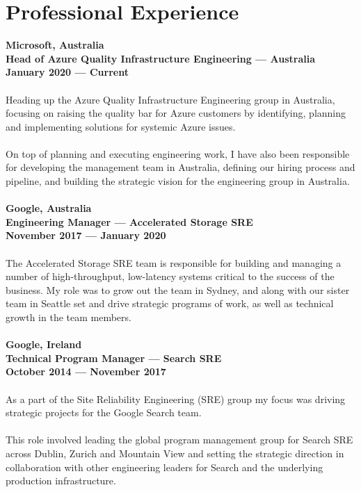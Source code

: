 \documentclass[a4paper]{article}
\begin{document}
\section*{Professional Experience}
\textbf{Microsoft, Australia\\Head of Azure Quality Infrastructure Engineering --- Australia\\January 2020 --- Current}\\\\
Heading up the Azure Quality Infrastructure Engineering group in Australia, focusing on raising the quality bar for Azure customers by identifying, planning and implementing solutions for systemic Azure issues.\\\\
On top of planning and executing engineering work, I have also been responsible for developing the management team in Australia, defining our hiring process and pipeline, and building the strategic vision for the engineering group in Australia.\\\\
\textbf{Google, Australia\\Engineering Manager --- Accelerated Storage SRE\\November 2017 --- January 2020}\\\\
The Accelerated Storage SRE team is responsible for building and managing a number of high-throughput, low-latency systems critical to the success of the business. My role was to grow out the team in Sydney, and along with our sister team in Seattle set and drive strategic programs of work, as well as technical growth in the team members.\\\\
\pagebreak
\ryanHeaderSmall
\textbf{Google, Ireland\\Technical Program Manager --- Search SRE\\October 2014 --- November 2017}\\\\
As a part of the Site Reliability Engineering (SRE) group my focus was driving strategic projects for the Google Search team.\\\\
This role involved leading the global program management group for Search SRE across Dublin, Zurich and Mountain View and setting the strategic direction in collaboration with other engineering leaders for Search and the underlying production infrastructure.\\\\
\end{document}
